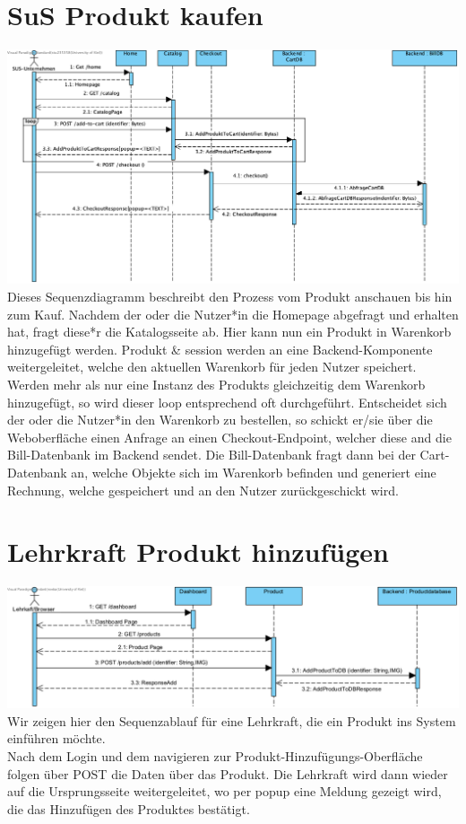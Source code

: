 \section{SuS Produkt kaufen}
\includegraphics[width=\textwidth]{img/sequence-sus-buy-product}
\label{fig: SuS Produkt kaufen Sequenzdiagramm}
Dieses Sequenzdiagramm beschreibt den Prozess vom Produkt anschauen bis hin zum Kauf. Nachdem der oder die Nutzer*in die Homepage abgefragt und erhalten hat, fragt diese*r die Katalogsseite ab. Hier kann nun ein Produkt in Warenkorb hinzugefügt werden. Produkt \& session werden an eine Backend-Komponente weitergeleitet, welche den aktuellen Warenkorb für jeden Nutzer speichert. Werden mehr als nur eine Instanz des Produkts gleichzeitig dem Warenkorb hinzugefügt, so wird dieser loop entsprechend oft durchgeführt. Entscheidet sich der oder die Nutzer*in den Warenkorb zu bestellen, so schickt er/sie über die Weboberfläche einen Anfrage an einen Checkout-Endpoint, welcher diese and die Bill-Datenbank im Backend sendet. Die Bill-Datenbank fragt dann bei der Cart-Datenbank an, welche Objekte sich im Warenkorb befinden und generiert eine Rechnung, welche gespeichert und an den Nutzer zurückgeschickt wird.

\section{Lehrkraft Produkt hinzufügen}
\includegraphics[width=\textwidth]{img/sequence-lehrkraft-add-product}
\label{fig: Lehrkraft Produkt hinzufügen Sequenzdiagramm}
Wir zeigen hier den Sequenzablauf für eine Lehrkraft, die ein Produkt ins System einführen möchte.\\
Nach dem Login und dem navigieren zur Produkt-Hinzufügungs-Oberfläche folgen über POST die Daten über das Produkt. Die Lehrkraft wird dann wieder auf die Ursprungsseite weitergeleitet, wo per popup eine Meldung gezeigt wird, die das Hinzufügen des Produktes bestätigt.
